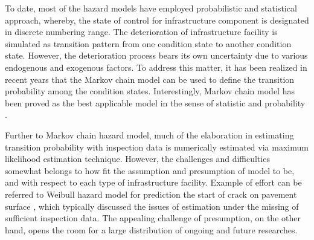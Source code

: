 %
To date, most of the hazard models have employed probabilistic and statistical approach, whereby, the state of control for infrastructure component is designated in discrete numbering range. The deterioration of infrastructure facility is simulated as transition pattern from one condition state to another condition state. However, the deterioration process bears its own uncertainty due to various endogenous and exogenous factors. To address this matter, it has been realized in recent years that the Markov chain model can be used to define the transition probability among the condition states. Interestingly, Markov chain model has been proved as the best applicable model in the sense of statistic and probability \cite{Takeyama,kenichi,Noriyuki}.

Further to Markov chain hazard model, much of the elaboration in estimating transition probability with inspection data is numerically estimated via maximum likelihood estimation technique. However, the challenges and difficulties somewhat belongs to how fit the assumption and presumption of model to be, and with respect to each type of infrastructure facility. Example of effort can be referred to Weibull hazard model for prediction the start of crack on pavement surface \cite{shin}, which typically discussed the issues of estimation under the missing of sufficient inspection data. The appealing challenge of presumption, on the other hand, opens the room for a large distribution of ongoing and future researches.

